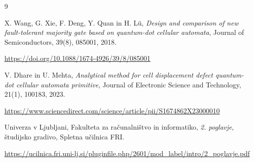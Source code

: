 \documentclass[12pt,a4paper]{article}
\begin{document}
\begin{thebibliography}{9}

X. Wang, G. Xie, F. Deng, Y. Quan in H. Lü,
\textit{Design and comparison of new fault-tolerant
majority gate based on quantum-dot cellular automata},
Journal of Semiconductors, 39(8), 085001, 2018.

\url{https://doi.org/10.1088/1674-4926/39/8/085001}

V. Dhare in U. Mehta,
\textit{Analytical method for cell displacement defect
quantum-dot cellular automata primitive},
Journal of Electronic Science and Technology,
21(1), 100183, 2023.

\url{https://www.sciencedirect.com/science/article/pii/S1674862X23000010}

Univerza v Ljubljani, Fakulteta za računalništvo in informatiko,
\textit{2. poglavje}, študijsko gradivo,
Spletna učilnica FRI.

\url{https://ucilnica.fri.uni-lj.si/pluginfile.php/2601/mod_label/intro/2_poglavje.pdf}

\end{thebibliography}
\end{document}

